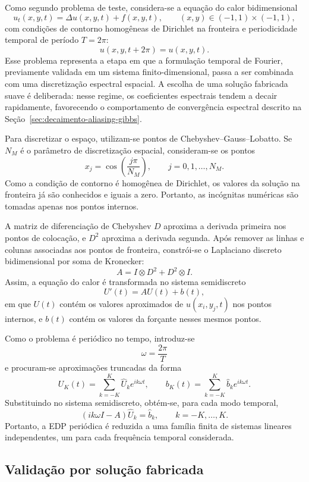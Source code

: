 Como segundo problema de teste, considera-se a equação do calor bidimensional
\[
u_t(x,y,t)=\Delta u(x,y,t)+f(x,y,t),
\qquad (x,y)\in(-1,1)\times(-1,1),
\]
com condições de contorno homogêneas de Dirichlet na fronteira e periodicidade temporal de período \(T=2\pi\):
\[
u(x,y,t+2\pi)=u(x,y,t).
\]
Esse problema representa a etapa em que a formulação temporal de Fourier, previamente validada em um sistema finito-dimensional, passa a ser combinada com uma discretização espectral espacial. A escolha de uma solução fabricada suave é deliberada: nesse regime, os coeficientes espectrais tendem a decair rapidamente, favorecendo o comportamento de convergência espectral descrito na Seção~\ref{sec:decaimento-aliasing-gibbs}.

Para discretizar o espaço, utilizam-se pontos de Chebyshev--Gauss--Lobatto. Se \(N_M\) é o parâmetro de discretização espacial, consideram-se os pontos
\[
x_j=\cos\left(\frac{j\pi}{N_M}\right),
\qquad j=0,1,\dots,N_M.
\]
Como a condição de contorno é homogênea de Dirichlet, os valores da solução na fronteira já são conhecidos e iguais a zero. Portanto, as incógnitas numéricas são tomadas apenas nos pontos internos.

A matriz de diferenciação de Chebyshev \(D\) aproxima a derivada primeira nos pontos de colocação, e \(D^2\) aproxima a derivada segunda. Após remover as linhas e colunas associadas aos pontos de fronteira, constrói-se o Laplaciano discreto bidimensional por soma de Kronecker:
\[
A=I\otimes D^2+D^2\otimes I.
\]
Assim, a equação do calor é transformada no sistema semidiscreto
\[
U'(t)=AU(t)+b(t),
\]
em que \(U(t)\) contém os valores aproximados de \(u(x_i,y_j,t)\) nos pontos internos, e \(b(t)\) contém os valores da forçante nesses mesmos pontos.

Como o problema é periódico no tempo, introduz-se
\[
\omega=\frac{2\pi}{T}
\]
e procuram-se aproximações truncadas da forma
\[
U_K(t)=\sum_{k=-K}^{K}\widehat{U}_k e^{ik\omega t},
\qquad
b_K(t)=\sum_{k=-K}^{K}\widehat{b}_k e^{ik\omega t}.
\]
Substituindo no sistema semidiscreto, obtém-se, para cada modo temporal,
\[
(ik\omega I-A)\widehat{U}_k=\widehat{b}_k,
\qquad k=-K,\dots,K.
\]
Portanto, a EDP periódica é reduzida a uma família finita de sistemas lineares independentes, um para cada frequência temporal considerada.

\subsection{Validação por solução fabricada}

